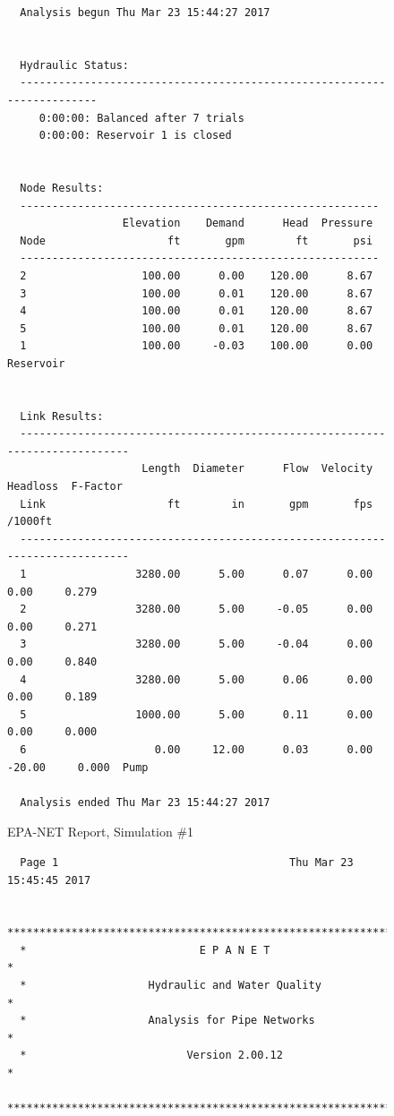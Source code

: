 \documentclass[11pt]{article}
\begin{document}
\begin{enumerate}
\begin{figure}[ht!]
\begin{verbatim}
  Analysis begun Thu Mar 23 15:44:27 2017

   
  Hydraulic Status:
  -----------------------------------------------------------------------
     0:00:00: Balanced after 7 trials
     0:00:00: Reservoir 1 is closed
   
   
  Node Results:
  --------------------------------------------------------
                  Elevation    Demand      Head  Pressure
  Node                   ft       gpm        ft       psi
  --------------------------------------------------------
  2                  100.00      0.00    120.00      8.67
  3                  100.00      0.01    120.00      8.67
  4                  100.00      0.01    120.00      8.67
  5                  100.00      0.01    120.00      8.67
  1                  100.00     -0.03    100.00      0.00  Reservoir
   
   
  Link Results:
  ----------------------------------------------------------------------------
                     Length  Diameter      Flow  Velocity  Headloss  F-Factor
  Link                   ft        in       gpm       fps   /1000ft          
  ----------------------------------------------------------------------------
  1                 3280.00      5.00      0.07      0.00      0.00     0.279
  2                 3280.00      5.00     -0.05      0.00      0.00     0.271
  3                 3280.00      5.00     -0.04      0.00      0.00     0.840
  4                 3280.00      5.00      0.06      0.00      0.00     0.189
  5                 1000.00      5.00      0.11      0.00      0.00     0.000
  6                    0.00     12.00      0.03      0.00    -20.00     0.000  Pump
   
  Analysis ended Thu Mar 23 15:44:27 2017
  \end{verbatim}
     \caption{EPA-NET Report, Simulation \#1}
   \label{fig:epanet1} 
\end{figure}

\begin{figure}[ht!] %
\centering
\begin{verbatim}
  Page 1                                    Thu Mar 23 15:45:45 2017

  ******************************************************************
  *                           E P A N E T                          *
  *                   Hydraulic and Water Quality                  *
  *                   Analysis for Pipe Networks                   *
  *                         Version 2.00.12                        *
  ******************************************************************
  

\end{verbatim}
\end{figure}
\end{enumerate}
\end{document}
